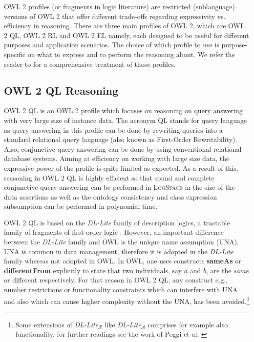 \documentclass{llncs}
\begin{document}
OWL 2 profiles (or fragments in logic literature) are restricted (sublanguage) versions of OWL 2 that offer different trade-offs regarding expressivity  vs. efficiency in reasoning. There are three main  profiles of OWL 2, which are OWL 2 QL, OWL 2 RL and OWL 2 EL namely, each designed to  be useful for different purposes and application scenarios. The choice of which profile to use is purpose-specific on what to express and to perform the reasoning about. We refer the reader to \cite{owl2profiles2008} for a comprehensive treatment of those profiles. 



\subsection{OWL 2 QL Reasoning}



OWL 2 QL is an OWL 2 profile which focuses on reasoning on query answering with very large size of instance data. The acronym QL stands for query language as query answering in this profile can be done by rewriting queries into a standard relational query language (also known as First-Order Rewritability). Also, conjunctive query answering can be done by using conventional relational database systems. Aiming at efficiency on working with large size data, the expressive power of the profile is quite limited as expected. As a result of this, reasoning in OWL 2 QL is highly efficient so that sound and complete conjunctive query answering can be performed in \textsc{LogSpace} in the size of the data assertions as well as  the ontology consistency and class expression subsumption can be performed in polynomial time.

OWL 2 QL is based on the \textit{DL-Lite} family of description logics, a tractable family of fragments of first-order logic \cite{Artale2009,Calvanese2007}. 
However, an important difference between the \textit{DL-Lite} family and OWL is the
unique name assumption (UNA). UNA is common in data management, therefore it is adopted in the \textit{DL-Lite} family whereas not adopted in OWL. In OWL, one uses constructs \textbf{sameAs} or \textbf{differentFrom} explicitly to state that two individuals, say  $a$ and $b$, are the \emph{same} or {different} respectively. For that reason in OWL 2 QL, any construct e.g., number restrictions or functionality constraints which can interfere with UNA and also which can cause higher complexity without the UNA, has been avoided.\footnote{Some extensions of \textit{DL-Lite}$_\mathcal{R}$ like \textit{DL-Lite}$_\mathcal{A}$ comprises for example also functionality, for further readings see the work of Poggi et al. \cite{poggi2008linking}}
\end{document}
